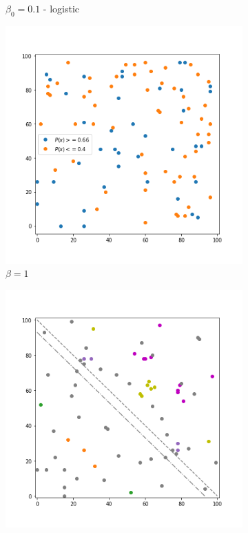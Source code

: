 \begin{figure}[!hb]
\begin{subfigure}{.3\textwidth}
	    \caption{$\beta_0=0.1$ - logistic}
	    \label{fig:23}
    \end{subfigure}%
	\begin{subfigure}{.3\textwidth}
    	\centering
    	\includegraphics[width=1\linewidth]{Bilder/simulation_4_3}
    	\caption{$\beta=1$}
    	\label{fig:24}
	\end{subfigure}
	\begin{subfigure}{.3\textwidth}%
    	\centering
    	\includegraphics[width=1\linewidth]{Bilder/simulation_2_5}

\end{subfigure}
\end{figure}
